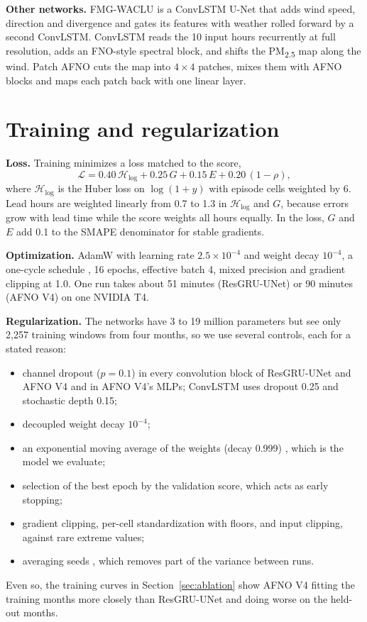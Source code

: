 \documentclass[conference]{IEEEtran}
\newcommand{\PM}{PM\textsubscript{2.5}}
\begin{document}
\textbf{Other networks.} FMG-WACLU is a ConvLSTM U-Net that adds wind speed, direction and divergence and gates its features with weather rolled forward by a second ConvLSTM. ConvLSTM reads the 10 input hours recurrently at full resolution, adds an FNO-style spectral block, and shifts the \PM{} map along the wind. Patch AFNO cuts the map into $4\times4$ patches, mixes them with AFNO blocks and maps each patch back with one linear layer.

\section{Training and regularization}
\label{sec:training}
\textbf{Loss.} Training minimizes a loss matched to the score,
\begin{equation}
\mathcal{L} = 0.40\,\mathcal{H}_{\log} + 0.25\,G + 0.15\,E + 0.20\,(1-\rho),
\end{equation}
where $\mathcal{H}_{\log}$ is the Huber loss on $\log(1+y)$ with episode cells weighted by 6. Lead hours are weighted linearly from 0.7 to 1.3 in $\mathcal{H}_{\log}$ and $G$, because errors grow with lead time while the score weights all hours equally. In the loss, $G$ and $E$ add 0.1 to the SMAPE denominator for stable gradients.

\textbf{Optimization.} AdamW \cite{loshchilov2019} with learning rate $2.5\times10^{-4}$ and weight decay $10^{-4}$, a one-cycle schedule \cite{smith2019}, 16 epochs, effective batch 4, mixed precision and gradient clipping at 1.0. One run takes about 51 minutes (ResGRU-UNet) or 90 minutes (AFNO V4) on one NVIDIA T4.

\textbf{Regularization.} The networks have 3 to 19 million parameters but see only 2{,}257 training windows from four months, so we use several controls, each for a stated reason:
\begin{itemize}
\item channel dropout ($p=0.1$) in every convolution block of ResGRU-UNet and AFNO V4 and in AFNO V4's MLPs; ConvLSTM uses dropout 0.25 and stochastic depth 0.15;
\item decoupled weight decay $10^{-4}$;
\item an exponential moving average of the weights (decay 0.999) \cite{polyak1992}, which is the model we evaluate;
\item selection of the best epoch by the validation score, which acts as early stopping;
\item gradient clipping, per-cell standardization with floors, and input clipping, against rare extreme values;
\item averaging seeds \cite{lakshminarayanan2017}, which removes part of the variance between runs.
\end{itemize}
Even so, the training curves in Section~\ref{sec:ablation} show AFNO V4 fitting the training months more closely than ResGRU-UNet and doing worse on the held-out months.
\end{document}
